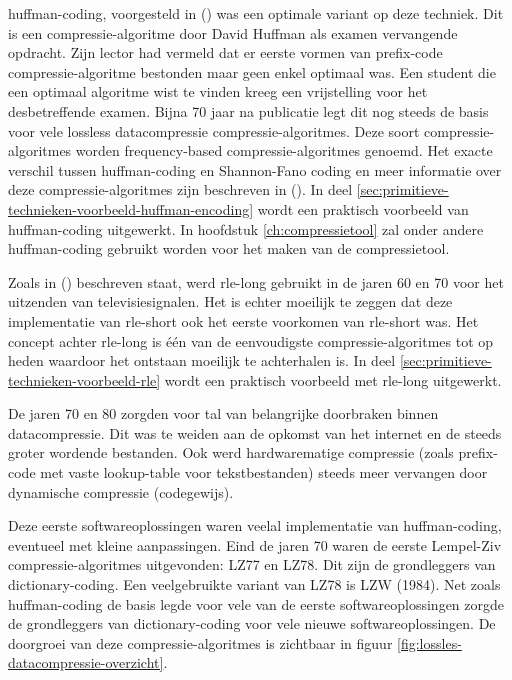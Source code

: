 \Gls{huffman-coding}, voorgesteld in   (\cite{huffman}) was een optimale variant op deze techniek. Dit is een \gls{compressie-algoritme} door David Huffman als examen vervangende opdracht. Zijn lector had vermeld dat er eerste vormen van \gls{prefix-code} \gls{compressie-algoritme} bestonden maar geen enkel optimaal was. Een student die een optimaal algoritme wist te vinden kreeg een vrijstelling voor het desbetreffende examen. Bijna 70 jaar na publicatie legt dit nog steeds de basis voor vele \gls{lossless} \gls{datacompressie} \glspl{compressie-algoritme}. Deze soort \glspl{compressie-algoritme} worden \gls{frequency-based} \glspl{compressie-algoritme} genoemd. Het exacte verschil tussen \gls{huffman-coding} en Shannon-Fano coding en meer informatie over deze \glspl{compressie-algoritme} zijn beschreven in  (\cite{lelewer87datacompression}). In deel \ref{sec:primitieve-technieken-voorbeeld-huffman-encoding} wordt een praktisch voorbeeld van \gls{huffman-coding} uitgewerkt. In hoofdstuk  \ref{ch:compressietool} zal onder andere \gls{huffman-coding} gebruikt worden voor het maken van de compressietool.

Zoals in  (\cite{robinson1967}) beschreven staat, werd \gls{rle-long} gebruikt in de jaren 60 en 70 voor het uitzenden van televisiesignalen. Het is echter moeilijk te zeggen dat deze implementatie van \gls{rle-short} ook het eerste voorkomen van \gls{rle-short} was. Het concept achter \gls{rle-long} is één van de eenvoudigste \glspl{compressie-algoritme} tot op heden waardoor het ontstaan moeilijk te achterhalen is. In deel \ref{sec:primitieve-technieken-voorbeeld-rle} wordt een praktisch voorbeeld met \gls{rle-long} uitgewerkt.

De jaren 70 en 80 zorgden voor tal van belangrijke doorbraken binnen \gls{datacompressie}. Dit was te weiden aan de opkomst van het internet en de steeds groter wordende bestanden. Ook werd hardwarematige compressie (zoals \gls{prefix-code} met vaste \gls{lookup-table} voor tekstbestanden) steeds meer vervangen door dynamische compressie (codegewijs). 


Deze eerste softwareoplossingen waren veelal implementatie van \gls{huffman-coding}, eventueel met kleine aanpassingen. Eind de jaren 70 waren de eerste Lempel-Ziv \glspl{compressie-algoritme} uitgevonden: LZ77 en LZ78. Dit zijn de grondleggers van \gls{dictionary-coding}. Een veelgebruikte variant van LZ78 is LZW (1984). Net zoals \gls{huffman-coding} de basis legde voor vele van de eerste softwareoplossingen zorgde de grondleggers van \gls{dictionary-coding} voor vele nieuwe softwareoplossingen. De doorgroei van deze \glspl{compressie-algoritme} is zichtbaar in figuur \ref{fig:lossles-datacompressie-overzicht}.

